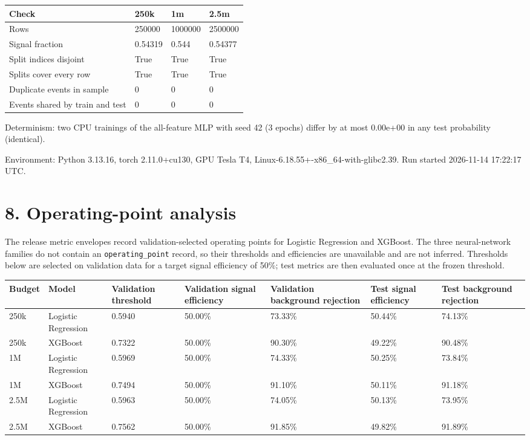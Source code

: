 \documentclass[11pt,a4paper,oneside]{report}
\begin{document}
\small\setlength{\tabcolsep}{3pt}\renewcommand{\arraystretch}{1.15}
\begin{longtable}{p{3.0cm} p{2.0cm} p{2.0cm} p{2.0cm}}
\toprule
Check & 250k & 1m & 2.5m \\ \midrule
Rows & 250000 & 1000000 & 2500000 \\ 
Signal fraction & 0.54319 & 0.544 & 0.54377 \\ 
Split indices disjoint & True & True & True \\ 
Splits cover every row & True & True & True \\ 
Duplicate events in sample & 0 & 0 & 0 \\ 
Events shared by train and test & 0 & 0 & 0 \\ 
\bottomrule
\end{longtable}


Determinism: two CPU trainings of the all-feature MLP with seed 42 (3 epochs) differ by at most 0.00e+00 in any test probability (identical).

Environment: Python 3.13.16, torch 2.11.0+cu130, GPU Tesla T4, Linux-6.18.55+-x86\_64-with-glibc2.39. Run started 2026-11-14 17:22:17 UTC.

\section{8. Operating-point analysis}

The release metric envelopes record validation-selected operating points for Logistic Regression and XGBoost. The three neural-network families do not contain an \texttt{operating\_point} record, so their thresholds and efficiencies are unavailable and are not inferred. Thresholds below are selected on validation data for a target signal efficiency of 50\%; test metrics are then evaluated once at the frozen threshold.

\begin{landscape}

\small\setlength{\tabcolsep}{3pt}\renewcommand{\arraystretch}{1.15}
\begin{longtable}{p{2.2cm} p{1.35cm} p{1.35cm} p{1.35cm} p{1.35cm} p{1.35cm} p{1.35cm}}
\toprule
Budget & Model & Validation threshold & Validation signal efficiency & Validation background rejection & Test signal efficiency & Test background rejection \\ \midrule
250k & Logistic Regression & 0.5940 & 50.00\% & 73.33\% & 50.44\% & 74.13\% \\ 
250k & XGBoost & 0.7322 & 50.00\% & 90.30\% & 49.22\% & 90.48\% \\ 
1M & Logistic Regression & 0.5969 & 50.00\% & 74.33\% & 50.25\% & 73.84\% \\ 
1M & XGBoost & 0.7494 & 50.00\% & 91.10\% & 50.11\% & 91.18\% \\ 
2.5M & Logistic Regression & 0.5963 & 50.00\% & 74.05\% & 50.13\% & 73.95\% \\ 
2.5M & XGBoost & 0.7562 & 50.00\% & 91.85\% & 49.82\% & 91.89\% \\ 
\bottomrule
\end{longtable}

\end{landscape}
\end{document}
